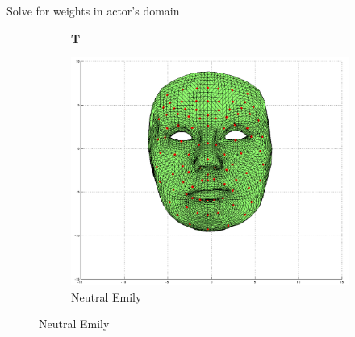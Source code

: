 \documentclass{beamer}
\begin{document}
\begin{frame}{Solve for weights in actor's domain}
{\begin{figure}
\begin{subfigure}[b]{0.2\textwidth}
                \caption{\hspace{0.2cm} $\mathbf{T}$}
        \end{subfigure}
        \begin{subfigure}[b]{0.3\textwidth}
                \includegraphics[width=\textwidth]{img/Eneutral}
                \caption{Neutral Emily}
        \end{subfigure}
\end{figure}}


\end{frame}
\end{document}
